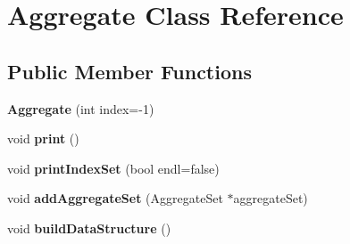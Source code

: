 \hypertarget{classAggregate}{\section{Aggregate Class Reference}
\label{classAggregate}
}
\subsection*{Public Member Functions}
\begin{DoxyCompactItemize}
\item 
\hypertarget{classAggregate_aa052d138c193b97f3bd868b8ceb0de8c}{{\bfseries Aggregate} (int index=-\/1)}\label{classAggregate_aa052d138c193b97f3bd868b8ceb0de8c}

\item 
\hypertarget{classAggregate_a1a009e90b0a43d706ce902c53a74a2d0}{void {\bfseries print} ()}\label{classAggregate_a1a009e90b0a43d706ce902c53a74a2d0}

\item 
\hypertarget{classAggregate_a305339dbd96c3eb1cf48e88be66c0766}{void {\bfseries print\-Index\-Set} (bool endl=false)}\label{classAggregate_a305339dbd96c3eb1cf48e88be66c0766}

\item 
\hypertarget{classAggregate_a579f6686dab8f7f1f2c15ea41f140f05}{void {\bfseries add\-Aggregate\-Set} (Aggregate\-Set $\ast$aggregate\-Set)}\label{classAggregate_a579f6686dab8f7f1f2c15ea41f140f05}

\item 
\hypertarget{classAggregate_a1bf8ff0450506a9a6f5e3f9ec2fdaa24}{void {\bfseries build\-Data\-Structure} ()}\label{classAggregate_a1bf8ff0450506a9a6f5e3f9ec2fdaa24}

\end{DoxyCompactItemize}
